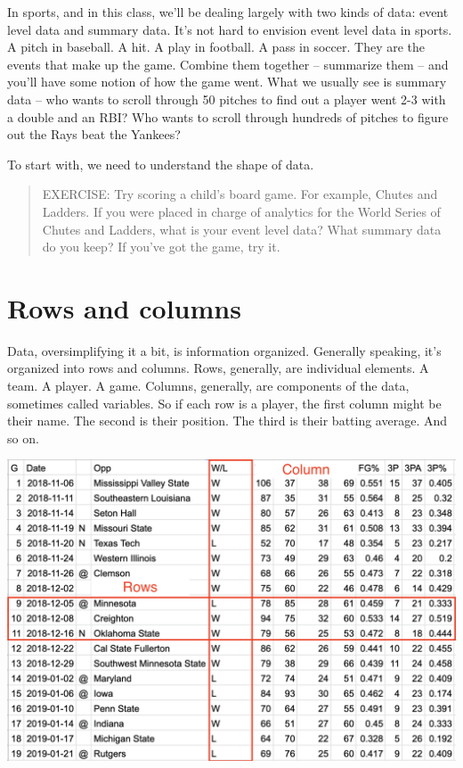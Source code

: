 \documentclass[]{book}
\begin{document}
In sports, and in this class, we'll be dealing largely with two kinds of
data: event level data and summary data. It's not hard to envision event
level data in sports. A pitch in baseball. A hit. A play in football. A
pass in soccer. They are the events that make up the game. Combine them
together -- summarize them -- and you'll have some notion of how the
game went. What we usually see is summary data -- who wants to scroll
through 50 pitches to find out a player went 2-3 with a double and an
RBI? Who wants to scroll through hundreds of pitches to figure out the
Rays beat the Yankees?

To start with, we need to understand the shape of data.

\begin{quote}
EXERCISE: Try scoring a child's board game. For example, Chutes and
Ladders. If you were placed in charge of analytics for the World Series
of Chutes and Ladders, what is your event level data? What summary data
do you keep? If you've got the game, try it.
\end{quote}

\section{Rows and columns}\label{rows-and-columns}

Data, oversimplifying it a bit, is information organized. Generally
speaking, it's organized into rows and columns. Rows, generally, are
individual elements. A team. A player. A game. Columns, generally, are
components of the data, sometimes called variables. So if each row is a
player, the first column might be their name. The second is their
position. The third is their batting average. And so on.

\includegraphics[width=22in]{images/data1}
\end{document}
